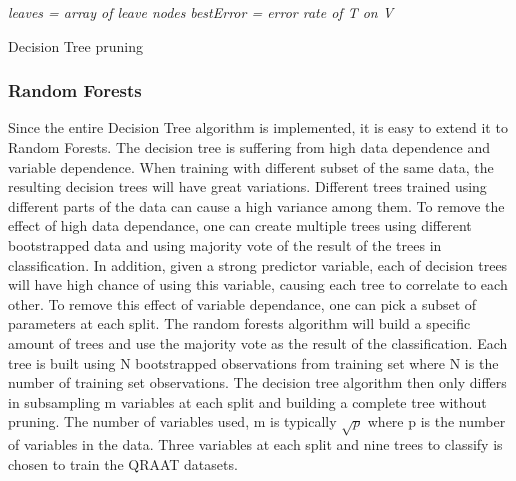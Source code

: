 \documentclass[twoside]{article}
\begin{document}
\IncMargin{1em}
\begin{algorithm}
\BlankLine
\emph{leaves = array of leave nodes}\;
\emph{bestError = error rate of T on V}\;
\caption{Decision Tree pruning}\label{DTp}
\end{algorithm}\DecMargin{1em}


\subsubsection{Random Forests}
Since the entire Decision Tree algorithm is implemented, it is easy to extend it to Random Forests. The decision tree is suffering from high data dependence and variable dependence. When training with different subset of the same data, the resulting decision trees will have great variations. Different trees trained using different parts of the data can cause a high variance among them. To remove the effect of high data dependance, one can create multiple trees using different bootstrapped data and using majority vote of the result of the trees in classification. In addition, given a strong predictor variable, each of decision trees will have high chance of using this variable, causing each tree to correlate to each other. To remove this effect of variable dependance, one can pick a subset of parameters at each split. The random forests algorithm will build a specific amount of trees and use the majority vote as the result of the classification. Each tree is built using N bootstrapped observations from training set where N is the number of training set observations. The decision tree algorithm then only differs in subsampling m variables at each split and building a complete tree without pruning. The number of variables used, m is typically $\sqrt{p}$ where p is the number of variables in the data. Three variables at each split and nine trees to classify is chosen to train the QRAAT datasets.
\end{document}

